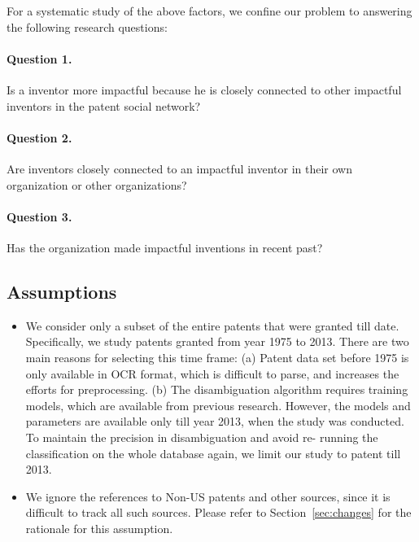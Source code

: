 For a systematic study of the above factors, we confine our problem to
answering the following research questions:

\paragraph{Question 1.} Is a inventor more impactful because he is closely
connected to other impactful inventors in the patent social network? 

\paragraph{Question  2.} Are inventors closely connected to an impactful
inventor in their own organization or other organizations? %

\paragraph{Question  3.} Has the organization made impactful inventions in
recent past? %


\subsection{Assumptions}
\label{sec:assumptions}


	\begin{itemize}
	\squish
		
		\item We consider only a subset of the entire patents that were granted till
		date. Specifically, we study patents granted from year 1975 to 2013. There are
		two main reasons for selecting this time frame: (a) Patent data set before
		1975 is only available in OCR format, which is difficult to parse, and
		increases the efforts for preprocessing. (b) The disambiguation algorithm
		requires training models, which are available from previous research. However,
		the models and parameters are available only till year 2013, when the study
		was conducted. To maintain the precision in disambiguation and avoid re-
		running the classification on the whole database again, we limit our study to
		patent till 2013.

		\item We ignore the references to Non-US patents and other sources, since it
		is difficult to track all such sources. Please refer to
		Section~\ref{sec:changes} for the rationale for this assumption.
	\end{itemize}


